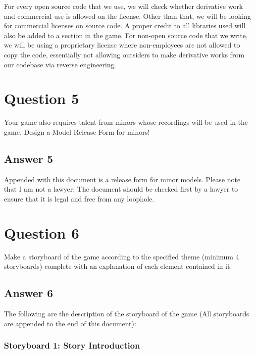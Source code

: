 \documentclass[
  11pt, %
]{assignment}
\begin{document}
For every open source code that we use, we will check whether derivative work and commercial use is allowed on the license. Other than that, we will be looking for commercial licenses on source code. A proper credit to all libraries used will also be added to a section in the game. For non-open source code that we write, we will be using a proprietary license where non-employees are not allowed to copy the code, essentially not allowing outsiders to make derivative works from our codebase via reverse engineering.



\section*{Question 5}

\begin{problem}
Your game also requires talent from minors whose recordings will be used in the game. Design a Model Release Form for minors!
\end{problem}

\subsection*{Answer 5}

Appended with this document is a release form for minor models. Please note that I am not a lawyer; The document should be checked first by a lawyer to ensure that it is legal and free from any loophole.

\section*{Question 6}
\begin{problem}
Make a storyboard of the game according to the specified theme (minimum 4 storyboards) complete with an explanation of each element contained in it.
\end{problem}

\subsection*{Answer 6}
The following are the description of the storyboard of the game (All storyboards are appended to the end of this document):

\subsubsection*{Storyboard 1: Story Introduction}
\end{document}

